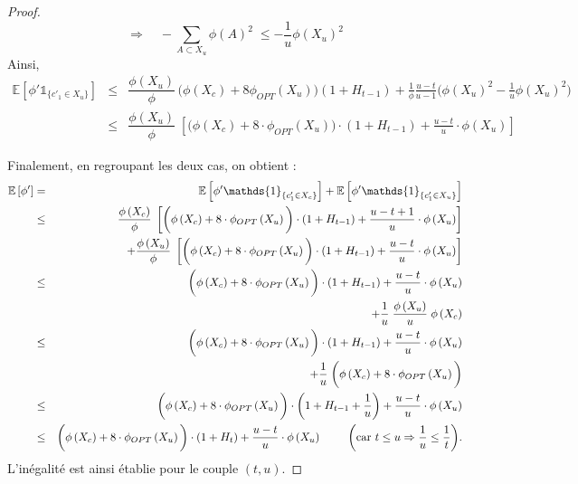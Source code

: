 \documentclass[12pt,a4paper]{book}
\newcommand{\E}{\mathbb{E}}
\newcommand{\1}{\mathds{1}}
\begin{document}
\begin{proof}
		  $$
		  	\Rightarrow \quad - \sum_{A \subset X_u} \phi \left( A \right)^2 \; \leq - \frac{1}{u} \phi \left( X_u \right)^2
		  $$
		  Ainsi,
		  \begin{eqnarray*}
		  	\E\left[\phi' \1_{\{c'_1 \in X_u\}} \right] & \leq & \dfrac{\phi \left( X_u \right)}{\phi} \, \bigg( \phi \left( X_c \right) + 8 \phi_{OPT} \left( X_u \right) \bigg) \left( 1 + H_{t-1} \right) + \frac{1}{\phi} \frac{u-t}{u-1} \bigg( \phi \left( X_u \right)^2 - \frac{1}{u} \phi \left( X_u \right)^2 \bigg)\\
		  	& \leq & \dfrac{\phi \left( X_u \right)}{\phi} \; \left[ \bigg( \phi \left( X_c \right) + 8 \cdot \phi_{OPT} \left( X_u \right) \bigg) \cdot \left( 1 + H_{t-1} \right) + \frac{u-t}{u} \cdot \phi \left( X_u \right) \right]
		  \end{eqnarray*}
		  
		  Finalement, en regroupant les deux cas, on obtient : 
		  \begin{eqnarray*}
		  	\E\left[ \phi' \right]&=& \E\left[\phi' \1_{\{c'_1 \in X_c\}} \right] + \E\left[\phi' \1_{\{c'_1 \in X_u\}} \right] \\
		  	& \leq & \dfrac{\phi \left( X_c \right)}{\phi} \; \left[ \bigg( \phi \left( X_c \right) + 8 \cdot \phi_{OPT} \left( X_u \right) \bigg) \cdot \left( 1 + H_{t-1} \right) + \frac{u-t+1}{u} \cdot \phi \left( X_u \right) \right] \\
		  	&& \quad + \dfrac{\phi \left( X_u \right)}{\phi} \; \left[ \bigg( \phi \left( X_c \right) + 8 \cdot \phi_{OPT} \left( X_u \right) \bigg) \cdot \left( 1 + H_{t-1} \right) + \frac{u-t}{u} \cdot \phi \left( X_u \right) \right] \\
		  	& \leq & \bigg( \phi \left( X_c \right) + 8 \cdot \phi_{OPT} \left( X_u \right) \bigg) \cdot \left( 1 + H_{t-1} \right) + \frac{u-t}{u} \cdot \phi \left( X_u \right)\\
		  	&& \qquad + \frac{1}{u} \; \dfrac{\phi \left( X_u \right)}{u} \; \phi \left( X_c \right) \\
		  	& \leq & \bigg( \phi \left( X_c \right) + 8 \cdot \phi_{OPT} \left( X_u \right) \bigg) \cdot \left( 1 + H_{t-1} \right) + \frac{u-t}{u} \cdot \phi \left( X_u \right)\\
		  	&& \qquad + \frac{1}{u} \; \bigg( \phi \left( X_c \right) + 8 \cdot \phi_{OPT} \left( X_u \right) \bigg)\\
		  	& \leq & \bigg( \phi \left( X_c \right) + 8 \cdot \phi_{OPT} \left( X_u \right) \bigg) \cdot \left( 1 + H_{t-1} + \frac{1}{u} \right) + \frac{u-t}{u} \cdot \phi \left( X_u \right) \\
		  	& \leq & \bigg( \phi \left( X_c \right) + 8 \cdot \phi_{OPT} \left( X_u \right) \bigg) \cdot \left( 1 + H_{t} \right) + \frac{u-t}{u} \cdot \phi \left( X_u \right) \textrm{ \qquad \bigg(car $t \leq u \Rightarrow \frac{1}{u} \leq \frac{1}{t}$\bigg).}
		  \end{eqnarray*}
		  L'inégalité est ainsi établie pour le couple $(t,u)$.
	\end{proof}
	
\end{document}
